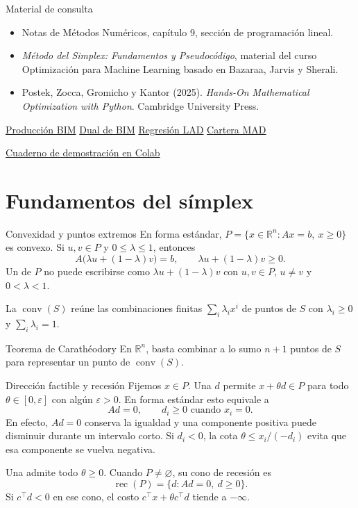 \documentclass[aspectratio=169,12pt]{beamer}
\newcommand{\libroPL}[2]{%
  \href{https://mobook.github.io/MO-book/notebooks/02/#1}{\textcolor{upazul}{#2}}}
\newcommand{\colabPL}[1]{%
  \href{https://colab.research.google.com/github/ovelasquezc/metodos-numericos-up/blob/main/laboratorios/Programacion_Lineal_2026-2.ipynb}{\textcolor{upazul}{#1}}}
\begin{document}
\begin{frame}{Material de consulta}
\begin{itemize}
\item Notas de Métodos Numéricos, capítulo 9, sección de programación lineal.
\item \emph{Método del Simplex: Fundamentos y Pseudocódigo}, material del curso
Optimización para Machine Learning basado en Bazaraa, Jarvis y Sherali.
\item Postek, Zocca, Gromicho y Kantor (2025).
\emph{Hands-On Mathematical Optimization with Python}. Cambridge University Press.
\end{itemize}
\medskip

\libroPL{01-bim.html}{Producción BIM}
\quad \libroPL{06-bim-dual.html}{Dual de BIM}
\quad \libroPL{02-lad-regression.html}{Regresión LAD}
\quad \libroPL{03-mad-portfolio-optimization.html}{Cartera MAD}
\par\medskip
\colabPL{Cuaderno de demostración en Colab}
\quad
\hyperlink{teoria-convexidad}{}
\end{frame}

\section{Fundamentos del símplex}

\begin{frame}[label=teoria-convexidad]{Convexidad y puntos extremos}
En forma estándar, $P=\{x\in\mathbb R^n:Ax=b,\ x\ge0\}$ es convexo.
Si $u,v\in P$ y $0\le\lambda\le1$, entonces
\[
 A\bigl(\lambda u+(1-\lambda)v\bigr)=b,\qquad
 \lambda u+(1-\lambda)v\ge0.
\]
Un  de $P$ no puede escribirse como
$\lambda u+(1-\lambda)v$ con $u,v\in P$, $u\ne v$ y $0<\lambda<1$.
\medskip

La  $\operatorname{conv}(S)$ reúne las
combinaciones finitas $\sum_i\lambda_i x^i$ de puntos de $S$ con
$\lambda_i\ge0$ y $\sum_i\lambda_i=1$.
\begin{block}{Teorema de Carathéodory}
En $\mathbb R^n$, basta combinar a lo sumo $n+1$ puntos de $S$ para
representar un punto de $\operatorname{conv}(S)$.
\end{block}
\end{frame}

\begin{frame}[label=teoria-rayos]{Dirección factible y recesión}
Fijemos $x\in P$. Una  $d$ permite
$x+\theta d\in P$ para todo $\theta\in[0,\varepsilon]$ con algún
$\varepsilon>0$. En forma estándar esto equivale a
\[
 Ad=0,\qquad d_i\ge0 \text{ cuando }x_i=0.
\]
En efecto, $Ad=0$ conserva la igualdad y una componente positiva
puede disminuir durante un intervalo corto. Si $d_i<0$, la cota
$\theta\le x_i/(-d_i)$ evita que esa componente se vuelva negativa.
\medskip

Una  admite todo $\theta\ge0$.
Cuando $P\ne\varnothing$, su cono de recesión es
\[
 \operatorname{rec}(P)=\{d:Ad=0,\ d\ge0\}.
\]
Si $c^\top d<0$ en ese cono, el costo $c^\top x+\theta c^\top d$
tiende a $-\infty$.
\end{frame}
\end{document}

